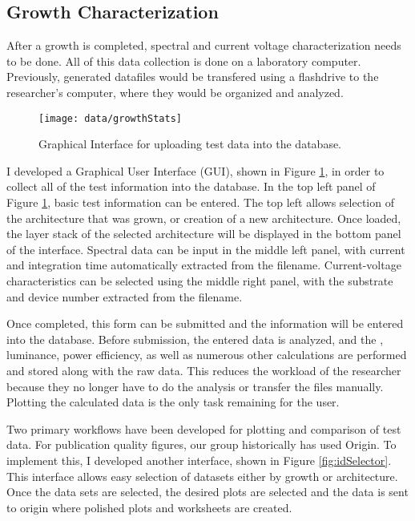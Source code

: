 \documentclass[../thesis.tex]{subfiles}
\begin{document}
\subsection{Growth Characterization}

After a growth is completed, spectral and current voltage characterization needs to be done.
All of this data collection is done on a laboratory computer.
Previously, generated datafiles would be transfered using a flashdrive to the researcher's computer, where they would be organized and analyzed.

\begin{figure}[ht]
\centering
\texttt{[image: data/growthStats]}
\caption{Graphical Interface for uploading test data into the database.}
\label{fig:growthStats}
\end{figure}

I developed a Graphical User Interface (GUI), shown in Figure \ref{fig:growthStats}, in order to collect all of the test information into the database.
In the top left panel of Figure \ref{fig:growthStats}, basic test information can be entered.  
The top left allows selection of the architecture that was grown, or creation of a new architecture.
Once loaded, the layer stack of the selected architecture will be displayed in the bottom panel of the interface.
Spectral data can be input in the middle left panel, with current and integration time automatically extracted from the filename.
Current-voltage characteristics can be selected using the middle right panel, with the substrate and device number extracted from the filename.

Once completed, this form can be submitted and the information will be entered into the database.
Before submission, the entered data is analyzed, and the \eqe, luminance, power efficiency, as well as numerous other calculations are performed and stored along with the raw data.
This reduces the workload of the researcher because they no longer have to do the analysis or transfer the files manually.
Plotting the calculated data is the only task remaining for the user.

Two primary workflows have been developed for plotting and comparison of test data.  
For publication quality figures, our group historically has used Origin.  
To implement this, I developed another interface, shown in Figure \ref{fig:idSelector}.
This interface allows easy selection of datasets either by growth or architecture.
Once the data sets are selected, the desired plots are selected and the data is sent to origin where polished plots and worksheets are created.
\end{document}
